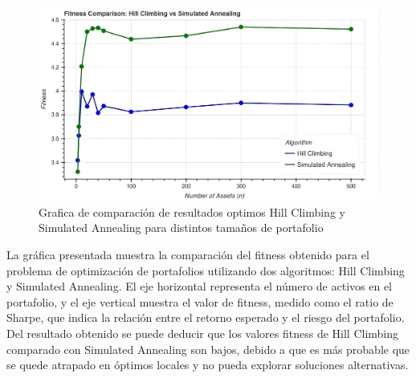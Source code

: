 \documentclass[9pt,a4paper,twoside]{rho-class/rho}
\begin{document}
        \begin{figure}[h]
            \centering
            \includegraphics[width=\linewidth]{figures/Fitness_Comparisson-9x.png}
            \caption{Grafica de comparación de resultados optimos Hill Climbing y Simulated Annealing para distintos tamaños de portafolio}
            \label{fig:sample_figure2}
        \end{figure}

        La gráfica presentada muestra la comparación del fitness obtenido para el problema de optimización de portafolios utilizando dos algoritmos: Hill Climbing y Simulated Annealing. El eje horizontal representa el número de activos en el portafolio, y el eje vertical muestra el valor de fitness, medido como el ratio de Sharpe, que indica la relación entre el retorno esperado y el riesgo del portafolio. Del resultado obtenido se puede deducir que los valores fitness de Hill Climbing comparado con Simulated Annealing son bajos, debido a que es más probable que se quede atrapado en óptimos locales y no pueda explorar soluciones alternativas.
        



\end{document}
